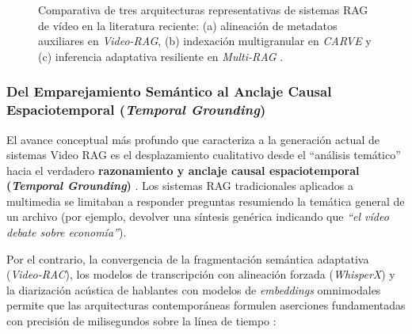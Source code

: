 \begin{figure}[htbp]
\caption{Comparativa de tres arquitecturas representativas de sistemas RAG de vídeo en la literatura reciente: (a) alineación de metadatos auxiliares en \textit{Video-RAG}, (b) indexación multigranular en \textit{CARVE} y (c) inferencia adaptativa resiliente en \textit{Multi-RAG} \cite{video_rag2024, multi_rag2025}.} %
\label{fig:arquitecturas_videorag_carve_multirag}
\end{figure}

\subsubsection{Del Emparejamiento Semántico al Anclaje Causal Espaciotemporal (\textit{Temporal Grounding})}
\label{subsubsec:anclaje_causal_espaciotemporal}

El avance conceptual más profundo que caracteriza a la generación actual de sistemas Video RAG es el desplazamiento cualitativo desde el ``análisis temático'' hacia el verdadero \textbf{razonamiento y anclaje causal espaciotemporal (\textit{Temporal Grounding})} \cite{mixpeek_chunking, gemini_emb2_docs}. %
Los sistemas RAG tradicionales aplicados a multimedia se limitaban a responder preguntas resumiendo la temática general de un archivo (por ejemplo, devolver una síntesis genérica indicando que \textit{``el vídeo debate sobre economía''}). %

Por el contrario, la convergencia de la fragmentación semántica adaptativa (\textit{Video-RAC}), los modelos de transcripción con alineación forzada (\textit{WhisperX}) y la diarización acústica de hablantes con modelos de \textit{embeddings} omnimodales permite que las arquitecturas contemporáneas formulen aserciones fundamentadas con precisión de milisegundos sobre la línea de tiempo \cite{video_rac2025, mixpeek_chunking}: %

